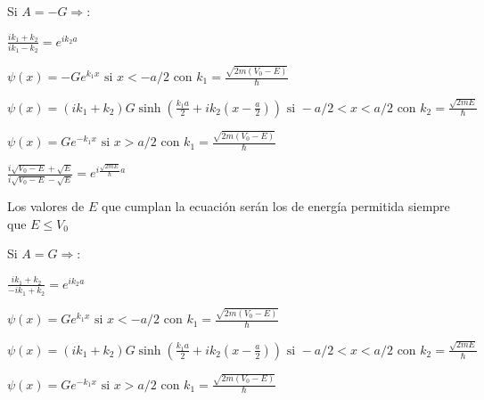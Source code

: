 \documentclass[oneside]{book}
\numberwithin{equation}{section}
\numberwithin{figure}{section}
\numberwithin{table}{section}
\begin{document}
		Si $A=-G \Rightarrow$:
		
				\begin{center}
					$\displaystyle \frac{ik_1+k_2}{ik_1-k_2}=e^{ik_2a}$
				\end{center}
				
				\begin{center}
					$\displaystyle \psi(x)=-Ge^{k_1x} \text{ si } x<-a/2 \text{ con } k_1=\frac{\sqrt{2m(V_0-E)}}{\hbar}$				
				\end{center}
				\begin{center}
					$\displaystyle \psi(x)=(ik_1+k_2)G \sinh \left(\frac{k_1a}{2}+ik_2(x-\frac{a}{2})\right) \text{ si } -a/2<x<a/2 \text{ con } k_2=\frac{\sqrt{2mE}}{\hbar}$
				\end{center}
				\begin{center}
					$\displaystyle \psi(x)=Ge^{-k_1x} \text{ si } x>a/2 \text{ con } k_1=\frac{\sqrt{2m(V_0-E)}}{\hbar}$
				\end{center}
				
				\begin{center}
					$\displaystyle \frac{i\sqrt{V_0-E}+\sqrt{E}}{i\sqrt{V_0-E}-\sqrt{E}}=e^{i\frac{\sqrt{2mE}}{\hbar}a}$
				\end{center}
				\begin{center}
					Los valores de $E$ que cumplan la ecuación serán los de energía permitida siempre que $E \leq V_0$
				\end{center}				
			
		Si $A=G \Rightarrow$:
		
				\begin{center}
					$\displaystyle \frac{ik_1+k_2}{-ik_1+k_2}=e^{ik_2a}$
				\end{center}
				
				\begin{center}
					$\displaystyle \psi(x)=Ge^{k_1x} \text{ si } x<-a/2 \text{ con } k_1=\frac{\sqrt{2m(V_0-E)}}{\hbar}$				
				\end{center}
				\begin{center}
					$\displaystyle \psi(x)=(ik_1+k_2)G \sinh \left(\frac{k_1a}{2}+ik_2(x-\frac{a}{2})\right) \text{ si } -a/2<x<a/2 \text{ con } k_2=\frac{\sqrt{2mE}}{\hbar}$
				\end{center}
				\begin{center}
					$\displaystyle \psi(x)=Ge^{-k_1x} \text{ si } x>a/2 \text{ con } k_1=\frac{\sqrt{2m(V_0-E)}}{\hbar}$
				\end{center}
				
\end{document}
